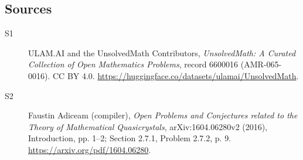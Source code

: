 \documentclass[11pt]{article}
\begin{document}
\subsection{Sources}
\begin{description}
\item[\hypertarget{source:6600016:1}{S1}] ULAM.AI and the UnsolvedMath Contributors, \emph{UnsolvedMath: A Curated Collection of Open Mathematics Problems}, record 6600016 (AMR-065-0016). CC BY 4.0. \url{https://huggingface.co/datasets/ulamai/UnsolvedMath}.
\item[\hypertarget{source:6600016:2}{S2}] Faustin Adiceam (compiler), \emph{Open Problems and Conjectures related to the Theory of Mathematical Quasicrystals}, arXiv:1604.06280v2 (2016), Introduction, pp. 1--2; Section 2.7.1, Problem 2.7.2, p. 9. \url{https://arxiv.org/pdf/1604.06280}.
\end{description}
\label{end:6600016}
\end{document}
